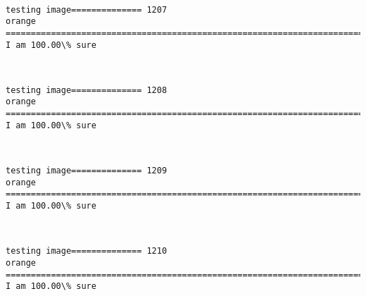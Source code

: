 \documentclass[11pt]{article}
\begin{document}
    \begin{center}
    \end{center}
    { \hspace*{\fill} \\}
    
    \begin{Verbatim}[commandchars=\\\{\}]
testing image============== 1207
orange
============================================================================
I am 100.00\% sure

    \end{Verbatim}

    \begin{center}
    \end{center}
    { \hspace*{\fill} \\}
    
    \begin{Verbatim}[commandchars=\\\{\}]
testing image============== 1208
orange
============================================================================
I am 100.00\% sure

    \end{Verbatim}

    \begin{center}
    \end{center}
    { \hspace*{\fill} \\}
    
    \begin{Verbatim}[commandchars=\\\{\}]
testing image============== 1209
orange
============================================================================
I am 100.00\% sure

    \end{Verbatim}

    \begin{center}
    \end{center}
    { \hspace*{\fill} \\}
    
    \begin{Verbatim}[commandchars=\\\{\}]
testing image============== 1210
orange
============================================================================
I am 100.00\% sure

    \end{Verbatim}
\end{document}

